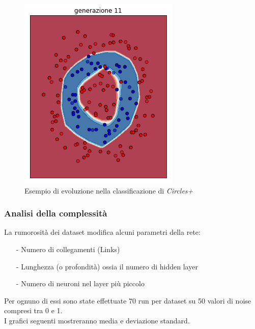 \documentclass{beamer}
\begin{document}
\begin{frame}
\begin{figure}
  \includegraphics[scale = 0.25]{images/circle+-rnd-log./11.png}
  \caption{\large Esempio di evoluzione nella classificazione di \textit{Circles+}}
 \end{figure}   
\end{frame}

\begin{frame}
 \frametitle{Analisi della complessità}
 La rumorosità dei dataset modifica alcuni parametri della rete:
 \begin{enumerate}
  \item [-] Numero di collegamenti (Links)
  \item [-] Lunghezza (o profondità) ossia il numero di hidden layer 
  \item [-] Numero di neuroni nel layer più piccolo
 \end{enumerate}
 Per ognuno di essi sono state effettuate 70 run per dataset su 50 valori di noise compresi tra 0 e 1. 
 \\
 I grafici seguenti mostreranno media e deviazione standard.
\end{frame}
\end{document}

